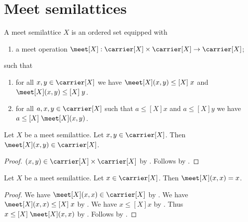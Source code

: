 


\section{Meet semilattices}

\begin{struct}\label{meet_semilattice}
    A meet semilattice $X$ is an ordered set
    equipped with
    \begin{enumerate}
        \item\label{meet_graph}
            a meet operation
            $\meet[X]:\carrier[X]\times\carrier[X]\to\carrier[X]$;
    \end{enumerate}
    such that
    \begin{enumerate}
        \item\label{meet_lb}
            for all $x,y\in\carrier[X]$ we have
                $\meet[X](x,y)\mathrel{\leq[X]}x$ and
                $\meet[X](x,y)\mathrel{\leq[X]}y$.
        \item\label{meet_glb}
            for all $a,x,y\in\carrier[X]$ such that
                $a\mathrel{\leq[X]}x$ and $a\mathrel{\leq[X]}y$ we have
                $a\mathrel{\leq[X]}\meet[X](x,y)$.
    \end{enumerate}
\end{struct}

\begin{proposition}\label{meet_type}
    Let $X$ be a meet semilattice.
    Let $x,y\in\carrier[X]$.
    Then $\meet[X](x,y)\in\carrier[X]$.
\end{proposition}
\begin{proof}
    $(x,y)\in\carrier[X]\times\carrier[X]$
        by .
    Follows by .
\end{proof}


\begin{proposition}\label{meet_idempotent}
    Let $X$ be a meet semilattice.
    Let $x\in\carrier[X]$.
    Then $\meet[X](x,x)=x$.
\end{proposition}
\begin{proof}
    We have $\meet[X](x,x)\in\carrier[X]$ by .
    We have $\meet[X](x,x)\mathrel{\leq[X]}x$ by .
    We have $x\mathrel{\leq[X]}x$
        by .
    Thus $x\mathrel{\leq[X]}\meet[X](x,x)$ by .
    Follows by .
\end{proof}

